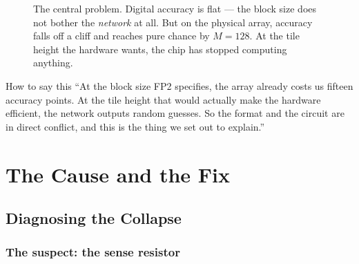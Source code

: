 \documentclass[11pt,a4paper]{report}
\begin{document}
\begin{figure}[h]
\centering
{}
\caption{The central problem. Digital accuracy is flat --- the block size does
not bother the \emph{network} at all. But on the physical array, accuracy
falls off a cliff and reaches pure chance by $M=128$. At the tile height the
hardware wants, the chip has stopped computing anything.}
\end{figure}

\begin{saybox}{How to say this}
``At the block size FP2 specifies, the array already costs us fifteen accuracy
points. At the tile height that would actually make the hardware efficient,
the network outputs random guesses. So the format and the circuit are in
direct conflict, and this is the thing we set out to explain.''
\end{saybox}

\part{The Cause and the Fix}
\chapter{Diagnosing the Collapse}

\section{The suspect: the sense resistor}
\end{document}
